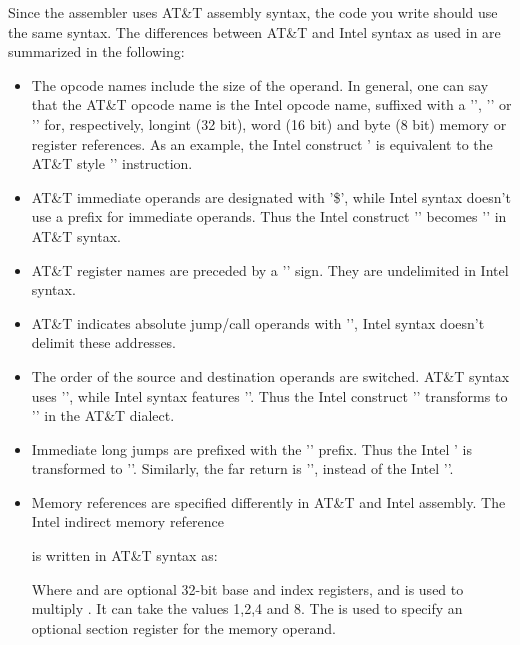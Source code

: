 Since the \gnu assembler uses AT\&T assembly syntax, the code you write should
use the same syntax. The differences between AT\&T and Intel syntax as used
in \tp are summarized in the following:
\begin{itemize}
\item The opcode names include the size of the operand. In general, one can
say that the AT\&T opcode name is the Intel opcode name, suffixed with a
'', '' or '' for, respectively, longint (32 bit),
word (16 bit) and byte (8 bit) memory or register references. As an example,
the Intel construct \mbox{'} is equivalent to the AT\&T style '' instruction.
\item AT\&T immediate operands are designated with '\$', while Intel syntax
doesn't use a prefix for immediate operands. Thus the Intel construct
'' becomes '' in AT\&T syntax.
\item AT\&T register names are preceded by a '\var{\%}' sign.
They are undelimited in Intel syntax.
\item AT\&T indicates absolute jump/call operands with '\var{*}', Intel
syntax doesn't delimit these addresses.
\item The order of the source and destination operands are switched. AT\&T
syntax uses '', while Intel syntax features ''. Thus the Intel construct '' transforms to
'' in the AT\&T dialect.
\item Immediate long jumps are prefixed with the '' prefix. Thus the
Intel ' is transformed to ''. Similarly, the far return is '', instead of the
Intel ''.
\item Memory references are specified differently in AT\&T and Intel
assembly. The Intel indirect memory reference
\begin{quote}
\end{quote}
is written in AT\&T syntax as:
\begin{quote}
\end{quote}
Where  and  are optional 32-bit base and index
registers, and  is used to multiply . It can take the
values 1,2,4 and 8. The  is used to specify an optional section
register for the memory operand.
\end{itemize}

